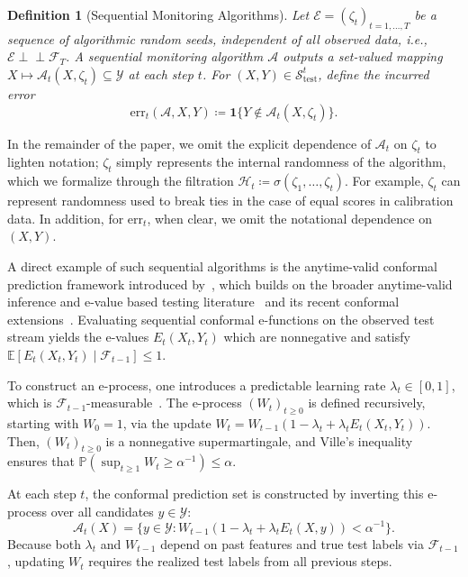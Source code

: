 \documentclass{uai2026} %
\newtheorem{definition}[theorem]{Definition}
\newcommand{\1}{\mathbf{1}}
\newcommand{\ind}[1]{\mathbf{1}\{#1\}}
\newcommand{\prob}{\mathbb{P}}
\newcommand{\expec}{\mathbb{E}}
\newcommand{\test}{\mathrm{test}}
\newcommand{\ycal}{\mathcal{Y}}
\newcommand{\scal}{\mathcal{S}}
\newcommand{\eqdef}{\coloneqq}
\newcommand{\ecal}{\mathcal{E}}
\newcommand{\err}{\mathrm{err}}
\newcommand{\indep}{\perp \!\!\! \perp}
\newcommand{\F}{\mathcal{F}}
\newcommand{\scaltest}{\scal_{\test}}
\newcommand{\acal}{\mathcal{A}}
\begin{document}
\begin{definition}[Sequential Monitoring Algorithms]
  Let $\ecal = (\zeta_t)_{t=1,\ldots,T}$ be a sequence of algorithmic random seeds, independent of all observed data, i.e.,  $\ecal \indep \F_T$. A sequential monitoring algorithm $\acal$ outputs a set-valued mapping $X \mapsto \acal_t(X, \zeta_t) \subseteq \ycal$ at each step $t$. For $(X, Y) \in \scaltest^t$, define the incurred error
  \begin{equation*}
    \err_t(\acal, X, Y) \eqdef \ind{Y \not\in \acal_t(X,\zeta_t)}.
  \end{equation*}
\end{definition}

In the remainder of the paper, we omit the explicit dependence of $\acal_t$ on $\zeta_t$ to lighten notation; $\zeta_t$ simply represents the internal randomness of the algorithm, which we formalize through the filtration $\mathcal{H}_t \eqdef \sigma(\zeta_1, \dots, \zeta_t)$. For example, $\zeta_t$ can represent randomness used to break ties in the case of equal scores in calibration data. In addition, for $\err_t$, when clear, we omit the notational dependence on $(X,Y)$. 

A direct example of such sequential algorithms is the anytime-valid conformal prediction framework introduced by~\citet{gauthier2025values}, which builds on the broader anytime-valid inference and e-value based testing literature~\citep{grunwald2020safe,vovk2021values,ramdas2023game,howard2021time} and its recent conformal extensions~\citep{vovk2025conformal,balinsky2024enhancing}.
Evaluating sequential conformal e-functions on the observed test stream yields the e-values $E_t(X_t, Y_t)$ which are nonnegative and satisfy $\expec[E_t(X_t, Y_t) \mid \F_{t-1}] \le 1$.

To construct an e-process, one introduces a predictable learning rate $\lambda_t \in [0,1]$, which is $\F_{t-1}$-measurable~\citep{waudby2025universal}. The e-process $(W_t)_{t\ge 0}$ is defined recursively, starting with $W_0=1$, via the update $W_t = W_{t-1} \left(1 - \lambda_t + \lambda_t E_t(X_t, Y_t)\right)$. Then, $(W_t)_{t \ge 0}$ is a nonnegative supermartingale, and Ville's inequality~\citep{ville1939etude} ensures that $\prob\left(\sup_{t\ge 1} W_t\ge \alpha^{-1}\right)\le \alpha.$

At each step $t$, the conformal prediction set is constructed by inverting this e-process over all candidates $y \in \ycal$:
\begin{equation*}
  \acal_t(X) = \{y \in \ycal \colon W_{t-1} (1 - \lambda_t + \lambda_t E_t(X, y)) < \alpha^{-1}\}.
\end{equation*}
Because both $\lambda_t$ and $W_{t-1}$ depend on past features and true test labels via $\F_{t-1}$, updating $W_t$ requires the realized test labels from all previous steps.
\end{document}
